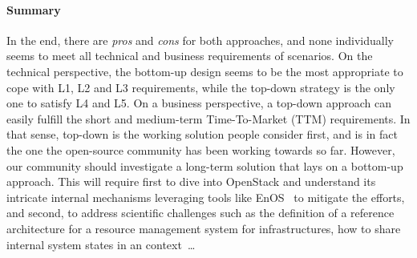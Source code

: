 \paragraph{Summary}
In the end, there are \emph{pros} and \emph{cons} for both approaches,
and none individually seems to meet all technical and business
requirements of \edge scenarios.
On the technical perspective, the bottom-up
design seems to be the most appropriate to cope with L1, L2 and L3
requirements, while the top-down strategy is the only one to satisfy L4
and L5.
%
On a business perspective, a top-down approach can easily fulfill the
short and medium-term Time-To-Market (TTM) requirements. In that
sense, top-down is the working solution people consider first, and is
in fact the one the open-source community has been working towards so
far.
%
However, our community should investigate a long-term solution that
lays on a bottom-up approach.  This will require first to dive into
OpenStack and understand its intricate internal mechanisms leveraging
tools like EnOS~\cite{cherrueau2017toward} to mitigate the efforts,
and second, to address scientific challenges such as the definition of
a reference architecture for a resource management system for \edge
infrastructures, how to share internal system states in an \edge
context~\ldots











